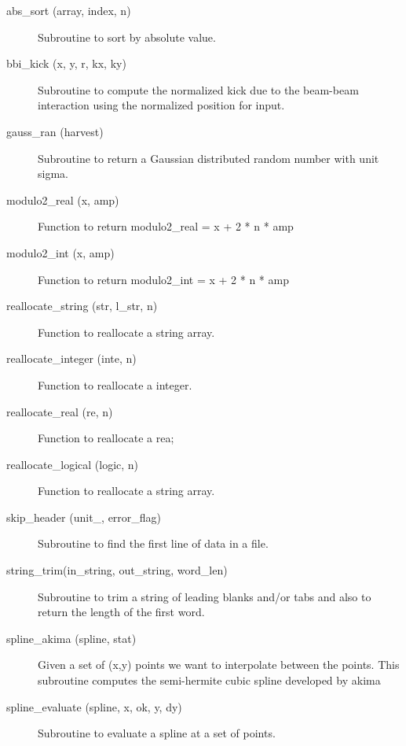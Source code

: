 \begin{description}

\item[abs\_sort (array, index, n)] \Newline 
  Subroutine to sort by absolute value.

\item[bbi\_kick (x, y, r, kx, ky)] \Newline 
Subroutine to compute the normalized kick due to the beam-beam
interaction using the normalized position for input.

\item[gauss\_ran (harvest)] \Newline 
Subroutine to return a Gaussian distributed random number with unit sigma.

\item[modulo2\_real (x, amp)] \Newline 
Function to return
modulo2\_real = x + 2 * n * amp

\item[modulo2\_int (x, amp)] \Newline 
Function to return
modulo2\_int = x + 2 * n * amp

\item[reallocate\_string (str, l\_str, n)] \Newline 
Function to reallocate a string array.

\item[reallocate\_integer (inte, n)] \Newline 
Function to reallocate a integer.

\item[reallocate\_real (re, n)] \Newline 
Function to reallocate a rea;

\item[reallocate\_logical (logic, n)] \Newline 
Function to reallocate a string array.

\item[skip\_header (unit\_, error\_flag)] \Newline 
Subroutine to find the first line of data in a file. 

\item[string\_trim(in\_string, out\_string, word\_len)] \Newline 
Subroutine to trim a string of leading blanks and/or tabs and also to return the
length of the first word.

\item[spline\_akima (spline, stat)] \Newline 
Given a set of (x,y) points we want to interpolate between the points.
This subroutine computes the semi-hermite cubic spline developed by akima

\item[spline\_evaluate (spline, x, ok, y, dy)] \Newline 
Subroutine to evaluate a spline at a set of points.

\end{description}
